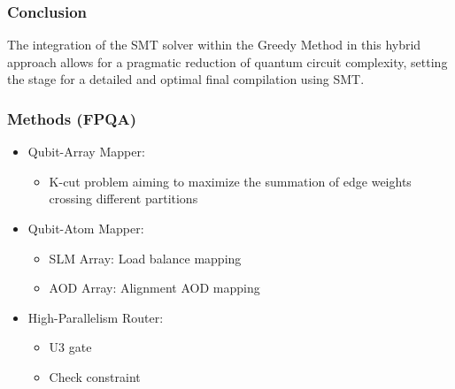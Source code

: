 \documentclass[18 pt]{beamer}
\begin{document}
\begin{frame}
    \frametitle{Conclusion}
    The integration of the SMT solver within the Greedy Method in this hybrid approach allows for a pragmatic reduction of quantum circuit complexity, setting the stage for a detailed and optimal final compilation using SMT.
\end{frame}

\begin{frame}
    \frametitle{Methods (FPQA)}
    \begin{itemize}
        \item Qubit-Array Mapper:
        \begin{itemize}
            \item K-cut problem aiming to maximize the summation of edge weights crossing different partitions
        \end{itemize}
        \item Qubit-Atom Mapper:
        \begin{itemize}
            \item SLM Array: Load balance mapping
            \item AOD Array: Alignment AOD mapping
        \end{itemize}
        \item High-Parallelism Router:
        \begin{itemize}
            \item U3 gate
            \item Check constraint
        \end{itemize}
    \end{itemize}
\end{frame}
\end{document}
